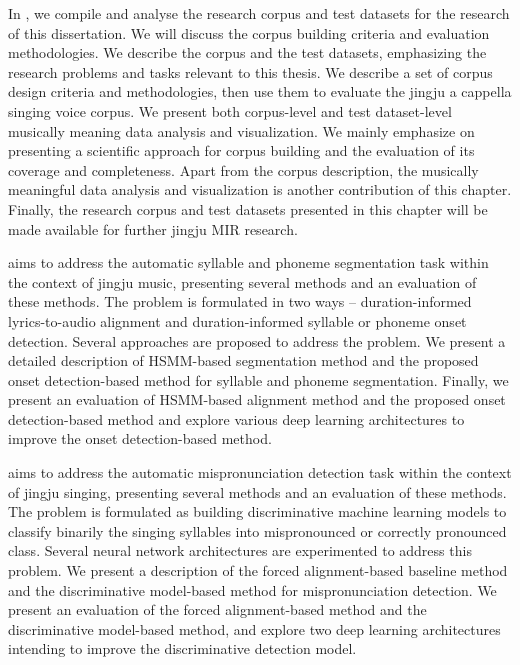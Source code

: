 In , we compile and analyse the research corpus and test datasets for the research of this dissertation. We will discuss the corpus building criteria and evaluation methodologies. We describe the corpus and the test datasets, emphasizing the research problems and tasks relevant to this thesis. We describe a set of corpus design criteria and methodologies, then use them to evaluate the jingju a cappella singing voice corpus. We present both corpus-level and test dataset-level musically meaning data analysis and visualization. We mainly emphasize on presenting a scientific approach for corpus building and the evaluation of its coverage and completeness. Apart from the corpus description, the musically meaningful data analysis and visualization is another contribution of this chapter. Finally, the research corpus and test datasets presented in this chapter will be made available for further jingju \gls{MIR} research.

 aims to address the automatic syllable and phoneme segmentation task within the context of jingju music, presenting several methods and an evaluation of these methods. The problem is formulated in two ways -- duration-informed lyrics-to-audio alignment and duration-informed syllable or phoneme onset detection. Several approaches are proposed to address the problem. We present a detailed description of \gls{HSMM}-based segmentation method and the proposed onset detection-based method for syllable and phoneme segmentation. Finally, we present an evaluation of \gls{HSMM}-based alignment method and the proposed onset detection-based method and explore various deep learning architectures to improve the onset detection-based method.

 aims to address the automatic mispronunciation detection task within the context of jingju singing, presenting several methods and an evaluation of these methods. The problem is formulated as building discriminative machine learning models to classify binarily the singing syllables into mispronounced or correctly pronounced class. Several neural network architectures are experimented to address this problem. We present a description of the forced alignment-based baseline method and the discriminative model-based method for mispronunciation detection. We present an evaluation of the forced alignment-based method and the discriminative model-based method, and explore two deep learning architectures intending to improve the discriminative detection model. 

